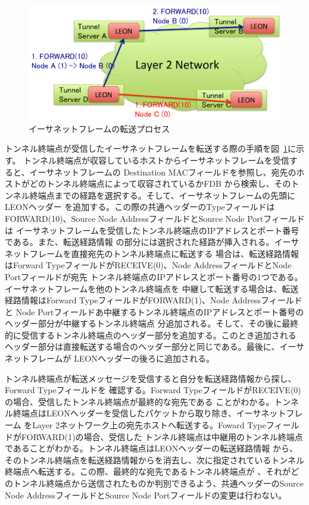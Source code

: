 \begin{figure}
	\begin{center}
		\includegraphics[scale=0.60]{./img/forwardproc}
		\caption{イーサネットフレームの転送プロセス}
		\label{img:fwdproc}
	\end{center}
\end{figure}

トンネル終端点が受信したイーサネットフレームを転送する際の手順を図~\ref{img:fwdproc}に示す。
トンネル終端点が収容しているホストからイーサネットフレームを受信すると、イーサネットフレームの
Destination MACフィールドを参照し、宛先のホストがどのトンネル終端点によって収容されているかFDB
から検索し、そのトンネル終端点までの経路を選択する。そして、イーサネットフレームの先頭にLEONヘッダー
を追加する。この際の共通ヘッダーのTypeフィールドはFORWARD(10)、Source Node AddressフィールドとSource Node Portフィールドは
イーサネットフレームを受信したトンネル終端点のIPアドレスとポート番号である。また、転送経路情報
の部分には選択された経路が挿入される。イーサネットフレームを直接宛先のトンネル終端点に転送する
場合は、転送経路情報はForward TypeフィールドがRECEIVE(0)、Node AddressフィールドとNode Portフィールドが宛先
トンネル終端点のIPアドレスとポート番号の1つである。イーサネットフレームを他のトンネル終端点を
中継して転送する場合は、転送経路情報はForward TypeフィールドがFORWARD(1)、Node Addressフィールドと
Node Portフィールドあ中継するトンネル終端点のIPアドレスとポート番号のヘッダー部分が中継するトンネル終端点
分追加される。そして、その後に最終的に受信するトンネル終端点のヘッダー部分を追加する。このとき追加される
ヘッダー部分は直接転送する場合のヘッダー部分と同じである。最後に、イーサネットフレームが
LEONヘッダーの後ろに追加される。

トンネル終端点が転送メッセージを受信すると自分を転送経路情報から探し、Forward Typeフィールドを
確認する。Forward TypeフィールドがRECEIVE(0)の場合、受信したトンネル終端点が最終的な宛先である
ことがわかる。トンネル終端点はLEONヘッダーを受信したパケットから取り除き、イーサネットフレーム
をLayer 2ネットワーク上の宛先ホストへ転送する。Foward TypeフィールドがFORWARD(1)の場合、受信した
トンネル終端点は中継用のトンネル終端点であることがわかる。トンネル終端点はLEONヘッダーの転送経路情報
から、そのトンネル終端点を転送経路情報からを消去し、次に指定されているトンネル終端点へ転送する。この際、最終的な宛先であるトンネル終端点が
、それがどのトンネル終端点から送信されたものか判別できるよう、共通ヘッダーのSource Node
AddressフィールドとSource Node Portフィールドの変更は行わない。

